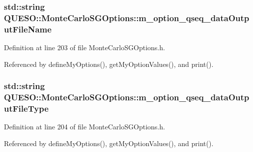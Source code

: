\hypertarget{class_q_u_e_s_o_1_1_monte_carlo_s_g_options_a30620452f8188a0b4a0519bed24e64d1}{
\subsubsection[{m\-\_\-option\-\_\-qseq\-\_\-data\-Output\-File\-Name}]{\setlength{\rightskip}{0pt plus 5cm}std\-::string Q\-U\-E\-S\-O\-::\-Monte\-Carlo\-S\-G\-Options\-::m\-\_\-option\-\_\-qseq\-\_\-data\-Output\-File\-Name\hspace{0.3cm}{\ttfamily [private]}}}\label{class_q_u_e_s_o_1_1_monte_carlo_s_g_options_a30620452f8188a0b4a0519bed24e64d1}


Definition at line 203 of file Monte\-Carlo\-S\-G\-Options.\-h.



Referenced by define\-My\-Options(), get\-My\-Option\-Values(), and print().

\hypertarget{class_q_u_e_s_o_1_1_monte_carlo_s_g_options_a7e07046865a2e99b61ac30b94dfc8306}{
\subsubsection[{m\-\_\-option\-\_\-qseq\-\_\-data\-Output\-File\-Type}]{\setlength{\rightskip}{0pt plus 5cm}std\-::string Q\-U\-E\-S\-O\-::\-Monte\-Carlo\-S\-G\-Options\-::m\-\_\-option\-\_\-qseq\-\_\-data\-Output\-File\-Type\hspace{0.3cm}{\ttfamily [private]}}}\label{class_q_u_e_s_o_1_1_monte_carlo_s_g_options_a7e07046865a2e99b61ac30b94dfc8306}


Definition at line 204 of file Monte\-Carlo\-S\-G\-Options.\-h.



Referenced by define\-My\-Options(), get\-My\-Option\-Values(), and print().

